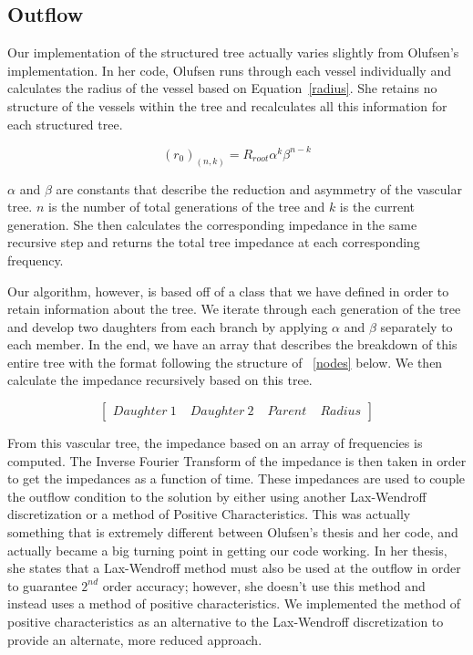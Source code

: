 \documentclass[12pt]{article}
\begin{document}
\subsection{Outflow}
Our implementation of the structured tree actually varies slightly from Olufsen's implementation. In her code, Olufsen runs through each vessel individually and calculates the radius of the vessel based on Equation~\eqref{radius}. She retains no structure of the vessels within the tree and recalculates all this information for each structured tree.

\begin{equation}
	\label{radius}
	(r_0)_(n,k) = R_{root} \alpha^k\beta^{n-k}
\end{equation}

$\alpha$ and $\beta$ are constants that describe the reduction and asymmetry of the vascular tree. $n$ is the number of total generations of the tree and $k$ is the current generation. She then calculates the corresponding impedance in the same recursive step and returns the total tree impedance at each corresponding frequency. 

Our algorithm, however, is based off of a class that we have defined in order to retain information about the tree. We iterate through each generation of the tree and develop two daughters from each branch by applying $\alpha$ and $\beta$ separately to each member. In the end, we have an array that describes the breakdown of this entire tree with the format following the structure of ~\eqref{nodes} below. We then calculate the impedance recursively based on this tree.

\begin{equation}
	\label{nodes}
	\begin{bmatrix}
		Daughter \: 1 \; & Daughter \: 2 \; & Parent \; & Radius 
	\end{bmatrix}
\end{equation}

From this vascular tree, the impedance based on an array of frequencies is computed. The Inverse Fourier Transform of the impedance is then taken in order to get the impedances as a function of time. These impedances are used to couple the outflow condition to the solution by either using another Lax-Wendroff discretization or a method of Positive Characteristics. This was actually something that is extremely different between Olufsen's thesis and her code, and actually became a big turning point in getting our code working. In her thesis, she states that a Lax-Wendroff method must also be used at the outflow in order to guarantee $2^{nd}$ order accuracy; however, she doesn't use this method and instead uses a method of positive characteristics. We implemented the method of positive characteristics as an alternative to the Lax-Wendroff discretization to provide an alternate, more reduced approach.
\end{document}
